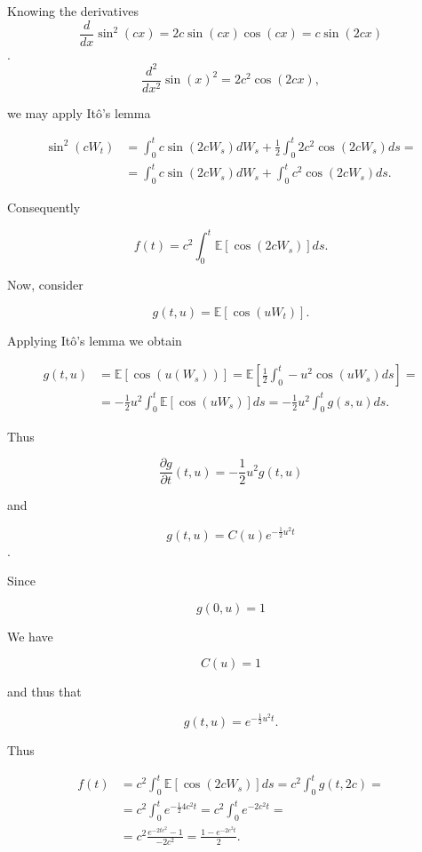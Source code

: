\documentclass{letter}
\begin{document}
Knowing the derivatives  $$\frac{d}{dx}\sin^2(cx)=2c\sin(cx)\cos(cx)=c\sin(2cx)$$. $$\frac{d^2}{dx^2}\sin(x)^2 = 2c^2\cos(2cx),$$

we may apply Itô's lemma

\begin{equation*}
\begin{split}
\sin^2(cW_t) &= \int_0^t c\sin(2cW_s)dW_s + \frac{1}{2}\int_0^t 2c^2\cos(2cW_s)ds =\\
&=\int_0^t c\sin(2cW_s)dW_s + \int_0^t c^2\cos(2cW_s)ds.
\end{split}
\end{equation*}

Consequently

$$f(t)=c^2\int_0^t\mathbb{E}\left[\cos(2cW_s)\right]ds.$$

Now, consider

$$g(t,u)=\mathbb{E}\left[\cos(uW_t)\right].$$

Applying Itô's lemma we obtain

\begin{equation*}
\begin{split}
g(t,u)&=\mathbb{E}\left[\cos(u(W_s))\right]=\mathbb{E}\left[\frac{1}{2}\int_0^t-u^2\cos(uW_s)ds\right]=\\
&=-\frac{1}{2}u^2\int_0^t\mathbb{E}\left[\cos(uW_s)\right]ds=-\frac{1}{2}u^2 \int_0^tg(s,u)ds.
\end{split}
\end{equation*}

Thus

$$\frac{\partial g}{\partial t}\left(t,u\right)=-\frac{1}{2}u^2 g\left(t,u\right)$$
\newpage

and

$$g(t,u)=C(u)e^{-\frac{1}{2}u^2t}$$.

Since

$$g(0,u)=1$$

We have

$$C(u)=1$$

and thus that

$$g(t,u)=e^{-\frac{1}{2}u^2t}.$$

Thus

\begin{equation*}
\begin{split}
f(t) & =c^2\int_0^t\mathbb{E}\left[\cos(2cW_s)\right]ds=c^2\int_0^tg(t,2c)=\\
&=c^2\int_0^te^{-\frac{1}{2}4c^2t}=c^2\int_0^te^{-2c^2t}=\\
&=c^2\frac{e^{-2tc^2}-1}{-2c^2}=\frac{1-e^{-2c^2t}}{2}.
\end{split}
\end{equation*}
\end{document}
